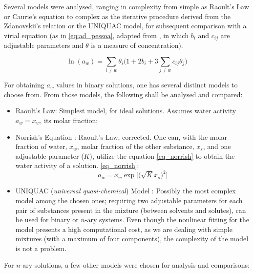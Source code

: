 \documentclass[
	12pt,				%
	openright,
	twoside,
	a4paper,			%
	brazil,			%
	french,				%
	english				%
	]{abntex2}
\begin{document}
Several models were analysed, ranging in complexity from simple as Raoult's Law
or Caurie's equation to complex as the iterative procedure derived from the
Zdanovskii's relation or the UNIQUAC model, for subsequent comparison with a
virial equation (as in \ref{eq:ad_pessoa}, adapted from \cite{pessoa2008}, in
which $b_i$ and $c_{ij}$ are adjustable parameters and $\theta$ is a measure
of concentration).

\begin{equation}
	\label{eq:ad_pessoa}
	\ln(a_w) = \sum_{i \neq w}\theta_i\Bigg(1 +%
	2b_i+3\sum_{j \neq w}c_{ij}\theta_j\Bigg)
\end{equation}

For obtaining $a_w$ values in binary solutions, one has several distinct models
to choose from. From those models, the following shall be analysed and compared:

\begin{itemize}
	\item Raoult's Law: Simplest model, for ideal solutions. Assumes
		water activity $a_w = x_w$, its molar fraction;
	\item Norrish's Equation \cite{norrish1966}: Raoult's Law, corrected.
		One can, with the molar fraction of water, $x_w$, molar
		fraction of the other substance, $x_s$, and one adjustable
		parameter ($K$), utilize the equation \ref{eq_norrish} to
		obtain the water activity of a solution.
		\ref{eq_norrish}:
		\begin{equation}
			\label{eq_norrish}
			a_w = x_w\exp\Big[\Big(\sqrt{K}x_s\Big)^2\Big]
		\end{equation}
	\item UNIQUAC (\textit{universal quasi-chemical}) Model
		\cite{abrams1975}: Possibly the most complex model among the
		chosen ones; requiring two adjustable parameters for each pair
		of substances present in the mixture (between solvents and
		solutes), can be used for binary or $n$-ary systems. Even though
		the nonlinear fitting for the model presents a high computational
		cost, as we are dealing with simple mixtures (with a maximum of
		four components), the complexity of the model is not a problem.
\end{itemize}

For $n$-ary solutions, a few other models were chosen for analysis and
comparisons:
\end{document}
